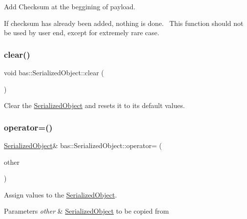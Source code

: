 Add Checksum at the beggining of payload. 

If checksum has already been added, nothing is done.~\newline
This function should not be used by user end, except for extremely rare case. \mbox{\label{classbas_1_1SerializedObject_a538908b313a8482b28a099f2f6257300}} 
\subsubsection{\texorpdfstring{clear()}{clear()}}
{\footnotesize\ttfamily void bas\+::\+Serialized\+Object\+::clear (\begin{DoxyParamCaption}{ }\end{DoxyParamCaption})\hspace{0.3cm}{\ttfamily [inline]}}



Clear the \mbox{\hyperlink{classbas_1_1SerializedObject}{Serialized\+Object}} and resets it to its default values. 

\mbox{\label{classbas_1_1SerializedObject_adcd56daab2c57709b134c4aa3df91c06}} 
\subsubsection{\texorpdfstring{operator=()}{operator=()}\hspace{0.1cm}{\footnotesize\ttfamily [1/2]}}
{\footnotesize\ttfamily \mbox{\hyperlink{classbas_1_1SerializedObject}{Serialized\+Object}}\& bas\+::\+Serialized\+Object\+::operator= (\begin{DoxyParamCaption}\item[{const \mbox{\hyperlink{classbas_1_1SerializedObject}{Serialized\+Object}} \&}]{other }\end{DoxyParamCaption})\hspace{0.3cm}{\ttfamily [inline]}}



Assign values to the \mbox{\hyperlink{classbas_1_1SerializedObject}{Serialized\+Object}}. 


\begin{DoxyParams}{Parameters}
{\em other} & \mbox{\hyperlink{classbas_1_1SerializedObject}{Serialized\+Object}} to be copied from \\
\hline
\end{DoxyParams}
\mbox{\label{classbas_1_1SerializedObject_a8d7c978da2ec196d541f04d327d12bbc}} 
